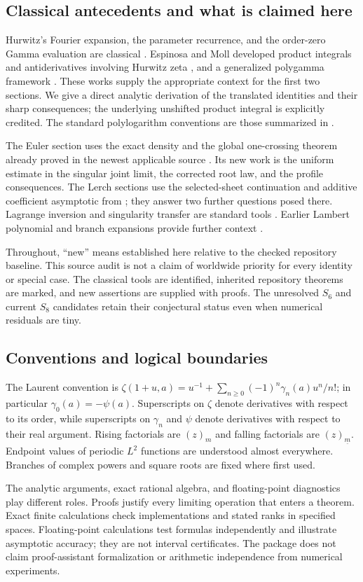 \subsection{Classical antecedents and what is claimed here}

Hurwitz's Fourier expansion, the parameter recurrence, and the
order-zero Gamma evaluation are classical \cite{DLMFHurwitz}.
Espinosa and Moll developed product integrals and antiderivatives involving
Hurwitz zeta \cite{EM1,EM2}, and a generalized polygamma framework
\cite{EMPoly}. These works supply the appropriate context for the first
two sections. We give a direct analytic derivation of the translated
identities and their sharp consequences; the underlying unshifted product
integral is explicitly credited. The standard polylogarithm conventions
are those summarized in \cite{DLMFPolylog}.

The Euler section uses the exact density and the global one-crossing
theorem already proved in the newest applicable source \cite{RepoEuler}.
Its new work is the uniform estimate in the singular joint limit, the
corrected root law, and the profile consequences. The Lerch sections use
the selected-sheet continuation and additive coefficient asymptotic from
\cite{RepoLerch}; they answer two further questions posed there. Lagrange
inversion and singularity transfer are standard tools
\cite{Gessel,FlajoletOdlyzko}. Earlier Lambert polynomial and branch
expansions provide further context \cite{KaluginJeffrey,Cohen}.

Throughout, ``new'' means established here relative to the checked
repository baseline. This source audit is not a claim of worldwide
priority for every identity or special case. The classical tools are
identified, inherited repository theorems are marked, and new assertions
are supplied with proofs. The unresolved $S_6$ and current $S_8$ candidates
retain their conjectural status even when numerical residuals are tiny.

\subsection{Conventions and logical boundaries}

The Laurent convention is
$\zeta(1+u,a)=u^{-1}+\sum_{n\geq0}(-1)^n\gamma_n(a)u^n/n!$;
in particular $\gamma_0(a)=-\psi(a)$. Superscripts on $\zeta$ denote
derivatives with respect to its order, while superscripts on
$\gamma_n$ and $\psi$ denote derivatives with respect to their real
argument. Rising factorials are $(z)_m$ and falling factorials are
$(z)_{\underline m}$. Endpoint values of periodic $L^2$ functions are
understood almost everywhere. Branches of complex powers and square
roots are fixed where first used.

The analytic arguments, exact rational algebra, and floating-point
diagnostics play different roles. Proofs justify every limiting operation
that enters a theorem. Exact finite calculations check implementations
and stated ranks in specified spaces. Floating-point calculations test
formulas independently and illustrate asymptotic accuracy; they are not
interval certificates. The package does not claim proof-assistant
formalization or arithmetic independence from numerical experiments.

